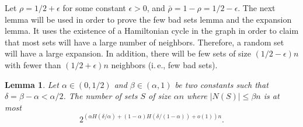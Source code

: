 \documentclass[11pt]{article}
\numberwithin{equation}{section}
\newtheorem{lemma}[theorem]{Lemma}
\theoremstyle{definition}
\theoremstyle{plain}
\newcommand{\ie}{i.\,e.}
\theoremstyle{plain}
\begin{document}
Let %
$\rho= 1/2 +\epsilon$  %
for some constant $\epsilon>0$,
and %
%
$\bar{\rho}=1-\rho= 1/2-\epsilon$. 
The next lemma will be used in order to prove the few bad sets lemma and the expansion lemma. It uses the existence 
of  %
a Hamiltonian cycle in the graph in order to claim that most sets will have a large number of neighbors. Therefore, a random set will have a large expansion. In addition, there will be few sets of size 
%
$(1/2-\epsilon)n$    %
with %
fewer than %
%
$(1/2+\epsilon)n$   %
neighbors (\ie, %
%
few bad sets).

\begin{lemma}
	Let $\alpha\in (0, 1/2)$ and $\beta \in (\alpha, 1)$ be two constants such that $\delta=\beta-\alpha < \alpha/2$. The number of sets $S$ of size $\alpha n$ where $|N(S)|\leq \beta n$ is at most $$2^{(\alpha H(\delta/ \alpha)+(1-\alpha)H(\delta/(1-\alpha))+o(1))n}.$$
	\label{lem:ham_alpha_beta}
\end{lemma}
\end{document}

